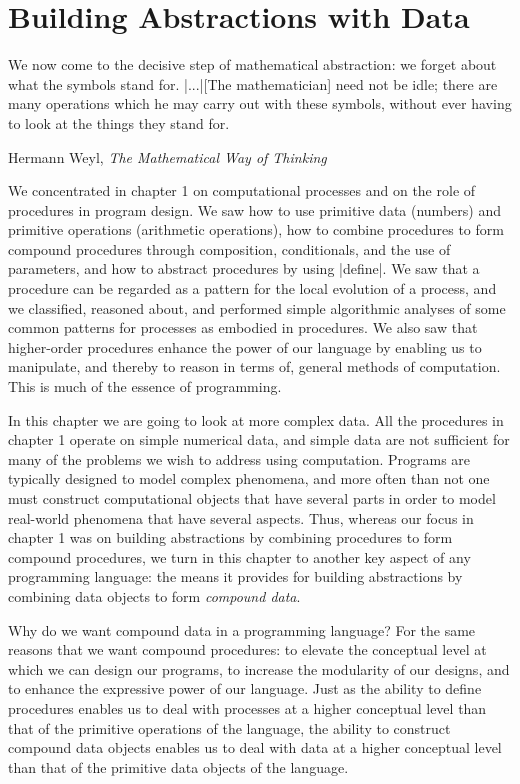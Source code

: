 
\chapter{Building Abstractions with Data}
\label{chap:2}

\epigraph{
We now come to the decisive step of mathematical abstraction: we
forget about what the symbols stand for. \scheme|...|[The mathematician]
need not be idle; there are many operations which he may carry out
with these symbols, without ever having to look at the things they
stand for.}{Hermann Weyl, \textit{The Mathematical Way of Thinking}}

We concentrated in chapter 1 on computational processes and on the
role of procedures in program design.  We saw how to use primitive
data (numbers) and primitive operations (arithmetic operations), how
to combine procedures to form compound procedures through composition,
conditionals, and the use of parameters, and how to abstract
procedures by using \scheme|define|.  We saw that a procedure can be
regarded as a pattern for the local evolution of a process, and we
classified, reasoned about, and performed simple algorithmic analyses
of some common patterns for processes as embodied in procedures.  We
also saw that higher-order procedures enhance the power of our
language by enabling us to manipulate, and thereby to reason in terms
of, general methods of computation.  This is much of the essence of
programming.

In this chapter we are going to look at more complex data.  All the
procedures in chapter 1 operate on simple numerical data, and simple
data are not sufficient for many of the problems we wish to address
using computation.  Programs are typically designed to model complex
phenomena, and more often than not one must construct computational
objects that have several parts in order to model real-world phenomena
that have several aspects.  Thus, whereas our focus in chapter 1 was
on building abstractions by combining procedures to form compound
procedures, we turn in this chapter to another key aspect of any
programming language: the means it provides for building abstractions
by combining data objects to form \textit{compound data}.

Why do we want compound data in a programming language?  For the same
reasons that we want compound procedures: to elevate the conceptual
level at which we can design our programs, to increase the modularity
of our designs, and to enhance the expressive power of our language.
Just as the ability to define procedures enables us to deal with
processes at a higher conceptual level than that of the primitive
operations of the language, the ability to construct compound data
objects enables us to deal with data at a higher conceptual level than
that of the primitive data objects of the language.

